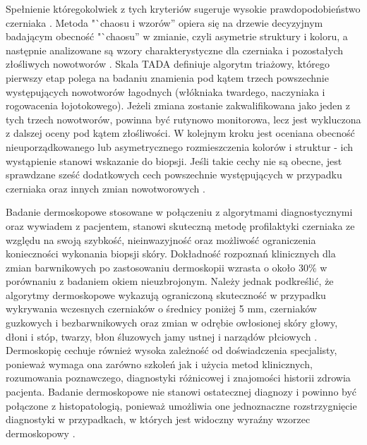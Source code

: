 Spełnienie któregokolwiek z tych kryteriów sugeruje wysokie prawdopodobieństwo czerniaka \cite{Menzies_Ingvar_Crotty_McCarthy_1996}.
Metoda "`chaosu i wzorów'' opiera się na drzewie decyzyjnym badającym obecność "`chaosu'' w zmianie, czyli asymetrie struktury i koloru, a następnie analizowane są wzory charakterystyczne dla czerniaka i pozostałych złośliwych nowotworów \cite{Rosendahl_Cameron_McColl_Wilkinson_2012}.
Skala TADA definiuje algorytm triażowy, którego pierwszy etap polega na badaniu znamienia pod kątem trzech powszechnie występujących nowotworów łagodnych (włókniaka twardego, naczyniaka i rogowacenia łojotokowego).
Jeżeli zmiana zostanie zakwalifikowana jako jeden z tych trzech nowotworów, powinna być rutynowo monitorowa, lecz jest wykluczona z dalszej oceny pod kątem złośliwości.
W kolejnym kroku jest oceniana obecność nieuporządkowanego lub asymetrycznego rozmieszczenia kolorów i struktur - ich wystąpienie stanowi wskazanie do biopsji.
Jeśli takie cechy nie są obecne, jest sprawdzane sześć dodatkowych cech powszechnie występujących w przypadku czerniaka oraz innych zmian nowotworowych \cite{Rogers_Marino_Dusza_Bajaj_Marchetti_Marghoob_2017}.

Badanie dermoskopowe stosowane w połączeniu z algorytmami diagnostycznymi oraz wywiadem z pacjentem, stanowi skuteczną metodę profilaktyki czerniaka ze względu na swoją szybkość, nieinwazyjność oraz możliwość ograniczenia konieczności wykonania biopsji skóry.
Dokładność rozpoznań klinicznych dla zmian barwnikowych po zastosowaniu dermoskopii wzrasta o około 30\% w porównaniu z badaniem okiem nieuzbrojonym.
Należy jednak podkreślić, że algorytmy dermoskopowe wykazują ograniczoną skuteczność w przypadku wykrywania wczesnych czerniaków o średnicy poniżej 5 mm, czerniaków guzkowych i bezbarwnikowych oraz zmian w odrębie owłosionej skóry głowy, dłoni i stóp, twarzy, błon śluzowych jamy ustnej i narządów płciowych \cite{Wysocki_2016, dermatoscopy-kamiska-wiciorek-spiewak, Sonthalia_Yumeen_Kaliyadan_2025, Davis_Piggott_Lyon_DeSanto_2020}.
Dermoskopię cechuje również wysoka zależność od doświadczenia specjalisty, ponieważ wymaga ona zarówno szkoleń jak i użycia metod klinicznych, rozumowania poznawczego, diagnostyki różnicowej i znajomości historii zdrowia pacjenta.
Badanie dermoskopowe nie stanowi ostatecznej diagnozy i powinno być połączone z histopatologią, ponieważ umożliwia one jednoznaczne rozstrzygnięcie diagnostyki w przypadkach, w których jest widoczny wyraźny wzorzec dermoskopowy \cite{Sonthalia_Yumeen_Kaliyadan_2025, Yélamos_Braun_Liopyris_Wolner_Kerl_Gerami_Marghoob_2019}. 


